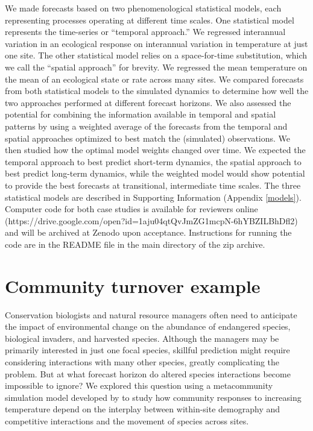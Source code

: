 \documentclass[11pt]{article}
\begin{document}
We made forecasts based on two phenomenological statistical models, each representing processes operating at different time scales. One statistical model represents the time-series or ``temporal approach.'' We regressed interannual variation in an ecological response on interannual variation in temperature at just one site. The other statistical model relies on a space-for-time substitution, which we call the ``spatial approach'' for brevity. We regressed the mean temperature on the mean of an ecological state or rate across many sites.  We compared forecasts from both statistical models to the simulated dynamics to determine how well the two approaches performed at different forecast horizons. We also assessed the potential for combining the information available in temporal and spatial patterns by using a weighted average of the forecasts from the temporal and spatial approaches optimized to best match the (simulated) observations. We then studied how the optimal model weights changed over time. We expected the temporal approach to best predict short-term dynamics, the spatial approach to best predict long-term dynamics, while the weighted model would show potential to provide the best forecasts at transitional, intermediate time scales. The three statistical models are described in Supporting Information (Appendix \ref{models}). Computer code for both case studies is available for reviewers online (https://drive.google.com/open?id=1aju04qtQvJmZG1mcpN-6hYBZILBhDfl2) and will be archived at Zenodo upon acceptance. Instructions for running the code are in the README file in the main directory of the zip archive.

\section*{Community turnover example}

Conservation biologists and natural resource managers often need to anticipate the impact of environmental change on the abundance of 
endangered species, biological invaders, and harvested species. Although the managers may be primarily interested in just one focal species, skillful prediction might require considering interactions with many other species, greatly complicating the problem. But at what forecast horizon do altered species interactions become impossible to ignore? We explored this question using a metacommunity simulation model developed by \cite{alexander_lags_2018} to study how community responses to increasing temperature depend on the interplay between within-site demography and competitive interactions and the movement of species across sites.
\end{document}
